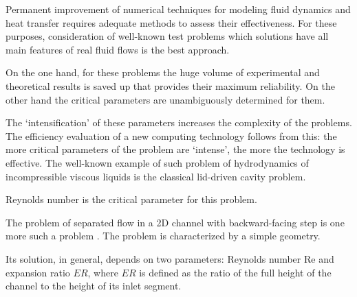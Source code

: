 \date{}








\renewcommand{\JournalDataOnline}{\displaydate{fomine}}




\makeentitle

%







Permanent improvement of numerical techniques for modeling fluid dynamics and heat transfer requires adequate methods to assess their effec\-ti\-ve\-ness. For these purposes, consideration of well-known test problems which solutions have all main features of real fluid flows is the best approach. 

On the one hand, for these problems the huge volume of experimental and theoretical results is saved up that provides their maximum reliability. On the other hand the critical parameters are unambiguously determined for them. 

The `intensification' of these parameters increases the complexity of the problems. The efficiency evaluation of a new computing technology follows from this: the more critical parameters of the problem are `intense', the more the technology is effective. The well-known example of such problem of hydrodynamics of incompressible viscous liquids is the classical lid-driven cavity problem. 

Reynolds number is the critical parameter for this problem.



The problem of separated flow in a 2D channel with backward-facing step is one more such a problem \cite{TaylNdefo}. The problem is characterized by a simple geometry. 

Its solution, in general, depends on two parameters: Reynolds number {\sf Re} and expansion ratio $ER$, where $ER$ is defined as the ratio of the full height of the channel to the height of its inlet segment. 

